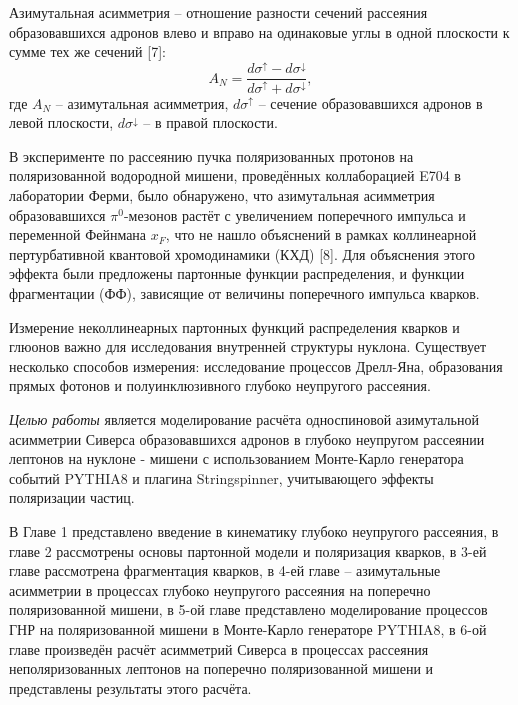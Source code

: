\documentclass{extarticle}
\begin{document}
Азимутальная асимметрия – отношение разности сечений рассеяния образовавшихся адронов влево и вправо на одинаковые углы в одной плоскости к сумме тех же сечений [7]:
\begin{equation}
    A_N =\frac{d\sigma^\uparrow -d\sigma^\downarrow }{d\sigma^\uparrow +d\sigma^\downarrow },
\end{equation} 
где $A_N$ -- азимутальная асимметрия, $d\sigma^\uparrow$  – сечение образовавшихся адронов в левой плоскости, $d\sigma^\downarrow$  – в правой плоскости.


 В эксперименте по рассеянию пучка поляризованных протонов на поляризованной водородной мишени, проведённых коллаборацией E704 в лаборатории Ферми, было обнаружено, что азимутальная асимметрия образовавшихся $\pi^0$-мезонов растёт с увеличением поперечного импульса и переменной Фейнмана $x_F$, что не нашло объяснений в рамках коллинеарной пертурбативной квантовой хромодинамики (КХД) [8]. Для объяснения этого эффекта были предложены партонные функции распределения, и функции фрагментации (ФФ), зависящие от величины поперечного импульса кварков.

 
 Измерение неколлинеарных партонных функций распределения кварков и глюонов важно для исследования внутренней структуры нуклона. Существует несколько способов измерения: исследование процессов Дрелл-Яна, образования прямых фотонов и полуинклюзивного глубоко неупругого рассеяния. 

\textit{Целью работы} является моделирование расчёта односпиновой азимутальной асимметрии Сиверса образовавшихся адронов в глубоко неупругом рассеянии лептонов на нуклоне - мишени с использованием Монте-Карло генератора событий PYTHIA8 и плагина Stringspinner, учитывающего эффекты поляризации частиц. 

В Главе 1 представлено введение в кинематику глубоко неупругого рассеяния, в главе 2 рассмотрены основы партонной модели и поляризация кварков, в 3-ей главе рассмотрена фрагментация кварков,  в 4-ей главе -- азимутальные асимметрии в процессах глубоко неупругого рассеяния на поперечно поляризованной мишени, в 5-ой главе представлено моделирование процессов ГНР на поляризованной мишени в Монте-Карло генераторе PYTHIA8, в 6-ой главе произведён расчёт асимметрий Сиверса в процессах рассеяния неполяризованных лептонов на поперечно поляризованной мишени и представлены результаты этого расчёта.

\newpage
\end{document}
